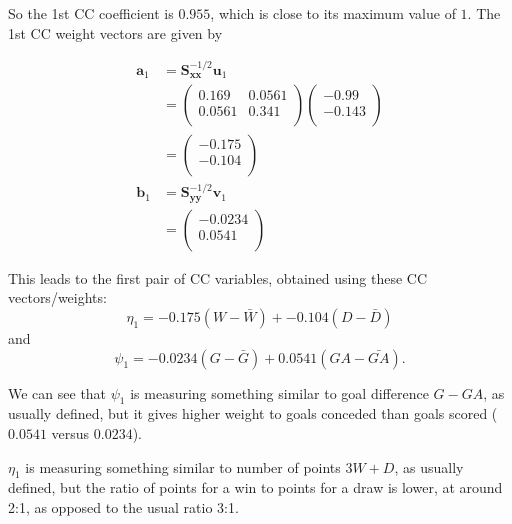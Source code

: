 \documentclass[
]{book}
\newenvironment{Shaded}{\begin{snugshade}}{\end{snugshade}}
\newcommand{\DecValTok}[1]{\textcolor[rgb]{0.00,0.00,0.81}{#1}}
\newcommand{\NormalTok}[1]{#1}
\newcommand{\OtherTok}[1]{\textcolor[rgb]{0.56,0.35,0.01}{#1}}
\newcommand{\SpecialCharTok}[1]{\textcolor[rgb]{0.00,0.00,0.00}{#1}}
\theoremstyle{definition}
\theoremstyle{definition}
\theoremstyle{definition}
\theoremstyle{definition}
\theoremstyle{remark}
\begin{document}
So the 1st CC coefficient is \(0.955\), which is close to its maximum value of \(1\). The 1st CC weight vectors are
given by

\begin{Shaded}
\end{Shaded}

\begin{align*}
\mathbf a_1&=\mathbf S_{\mathbf x\mathbf x}^{-1/2}\mathbf u_1\\
&=\begin{pmatrix}0.169&0.0561 \\0.0561&0.341 \\\end{pmatrix}\begin{pmatrix}-0.99 \\-0.143 \\\end{pmatrix}\\
&=\begin{pmatrix}-0.175 \\-0.104 \\\end{pmatrix}\\
\mathbf b_1 &=\mathbf S_{\mathbf y\mathbf y}^{-1/2}\mathbf v_1\\
&= \begin{pmatrix}-0.0234 \\0.0541 \\\end{pmatrix}
\end{align*}

This leads to the first pair of CC variables, obtained using these CC vectors/weights:
\[
\eta_1 =-0.175 (W-\bar{W}) +-0.104(D -\bar{D})
\]
and
\[
 \psi_1 = -0.0234(G-\bar{G}) +0.0541(GA-\bar{GA}).
\]

We can see that \(\psi_1\) is measuring something similar to goal difference \(G-GA\), as usually defined, but it gives higher weight to goals conceded than goals scored (\(0.0541\) versus \(0.0234\)).

\(\eta_1\) is measuring something similar to number of points \(3W+D\), as usually defined, but the ratio of points for a win to points for a draw is lower, at around 2:1, as opposed to the usual ratio 3:1.
\end{document}
